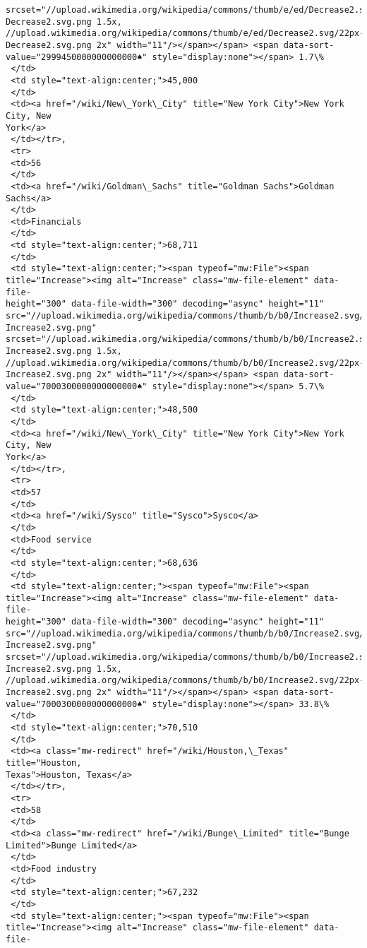 \documentclass[11pt]{article}
\begin{document}
\begin{tcolorbox}[breakable, size=fbox, boxrule=.5pt, pad at break*=1mm, opacityfill=0]
\begin{Verbatim}[commandchars=\\\{\}]
srcset="//upload.wikimedia.org/wikipedia/commons/thumb/e/ed/Decrease2.svg/17px-
Decrease2.svg.png 1.5x,
//upload.wikimedia.org/wikipedia/commons/thumb/e/ed/Decrease2.svg/22px-
Decrease2.svg.png 2x" width="11"/></span></span> <span data-sort-
value="2999450000000000000♠" style="display:none"></span> 1.7\%
 </td>
 <td style="text-align:center;">45,000
 </td>
 <td><a href="/wiki/New\_York\_City" title="New York City">New York City, New
York</a>
 </td></tr>,
 <tr>
 <td>56
 </td>
 <td><a href="/wiki/Goldman\_Sachs" title="Goldman Sachs">Goldman Sachs</a>
 </td>
 <td>Financials
 </td>
 <td style="text-align:center;">68,711
 </td>
 <td style="text-align:center;"><span typeof="mw:File"><span
title="Increase"><img alt="Increase" class="mw-file-element" data-file-
height="300" data-file-width="300" decoding="async" height="11"
src="//upload.wikimedia.org/wikipedia/commons/thumb/b/b0/Increase2.svg/11px-
Increase2.svg.png"
srcset="//upload.wikimedia.org/wikipedia/commons/thumb/b/b0/Increase2.svg/17px-
Increase2.svg.png 1.5x,
//upload.wikimedia.org/wikipedia/commons/thumb/b/b0/Increase2.svg/22px-
Increase2.svg.png 2x" width="11"/></span></span> <span data-sort-
value="7000300000000000000♠" style="display:none"></span> 5.7\%
 </td>
 <td style="text-align:center;">48,500
 </td>
 <td><a href="/wiki/New\_York\_City" title="New York City">New York City, New
York</a>
 </td></tr>,
 <tr>
 <td>57
 </td>
 <td><a href="/wiki/Sysco" title="Sysco">Sysco</a>
 </td>
 <td>Food service
 </td>
 <td style="text-align:center;">68,636
 </td>
 <td style="text-align:center;"><span typeof="mw:File"><span
title="Increase"><img alt="Increase" class="mw-file-element" data-file-
height="300" data-file-width="300" decoding="async" height="11"
src="//upload.wikimedia.org/wikipedia/commons/thumb/b/b0/Increase2.svg/11px-
Increase2.svg.png"
srcset="//upload.wikimedia.org/wikipedia/commons/thumb/b/b0/Increase2.svg/17px-
Increase2.svg.png 1.5x,
//upload.wikimedia.org/wikipedia/commons/thumb/b/b0/Increase2.svg/22px-
Increase2.svg.png 2x" width="11"/></span></span> <span data-sort-
value="7000300000000000000♠" style="display:none"></span> 33.8\%
 </td>
 <td style="text-align:center;">70,510
 </td>
 <td><a class="mw-redirect" href="/wiki/Houston,\_Texas" title="Houston,
Texas">Houston, Texas</a>
 </td></tr>,
 <tr>
 <td>58
 </td>
 <td><a class="mw-redirect" href="/wiki/Bunge\_Limited" title="Bunge
Limited">Bunge Limited</a>
 </td>
 <td>Food industry
 </td>
 <td style="text-align:center;">67,232
 </td>
 <td style="text-align:center;"><span typeof="mw:File"><span
title="Increase"><img alt="Increase" class="mw-file-element" data-file-

\end{Verbatim}
\end{tcolorbox}
\end{document}
